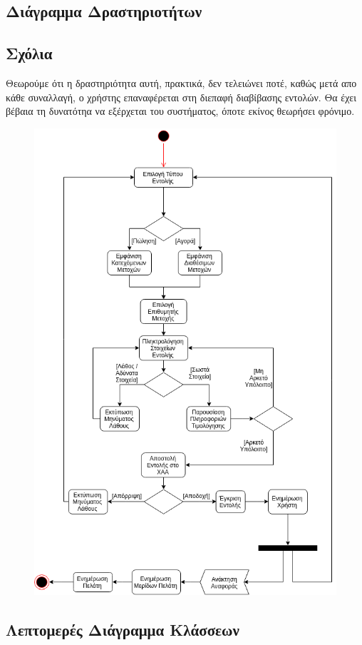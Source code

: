 \documentclass{article}
\begin{document}
\newpage
\subsection{Διάγραμμα Δραστηριοτήτων}
\subsection*{Σχόλια}
Θεωρούμε ότι η δραστηριότητα αυτή, πρακτικά, δεν τελειώνει ποτέ, καθώς μετά απο κάθε συναλλαγή, 
ο χρήστης επαναφέρεται στη διεπαφή διαβίβασης εντολών. Θα έχει βέβαια τη δυνατότηα να εξέρχεται
του συστήματος, όποτε εκίνος θεωρήσει φρόνιμο.
\begin{figure}[!h]
	\includegraphics[width=12cm]{../UML/Activity_Diagram.png}
\end{figure}

\newpage
\subsection{Λεπτομερές Διάγραμμα Κλάσσεων}
\end{document}
